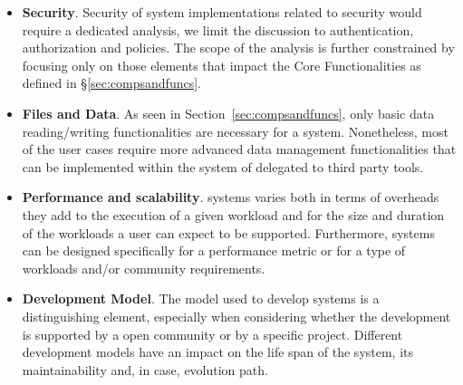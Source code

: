 \documentclass{sig-alternate}
\begin{document}
\begin{itemize}

\item \textbf{Security}. Security of \pilot system implementations related to
  security would require a dedicated analysis, we limit the discussion to
  authentication, authorization and policies. The scope of the analysis is
  further constrained by focusing only on those elements that impact the Core
  Functionalities as defined in \S\ref{sec:compsandfuncs}.


\item \textbf{Files and Data}. As seen in Section~\ref{sec:compsandfuncs}, only
  basic data reading/writing functionalities are necessary for a \pilot system.
  Nonetheless, most of the user cases require more advanced data management
  functionalities that can be implemented within the \pilot system of delegated
  to third party tools.

\item \textbf{Performance and scalability}. \pilot systems varies both in
  terms of overheads they add to the execution of a given workload and for the
  size and duration of the workloads a user can expect to be supported.
  Furthermore, \pilot systems can be designed specifically for a performance
  metric or for a type of workloads and/or community requirements.

\item \textbf{Development Model}. The model used to develop \pilot systems is a
  distinguishing element, especially when considering whether the development
  is supported by a open community or by a specific project. Different
  development models have an impact on the life span of the \pilot system, its
  maintainability and, in case, evolution path.

\end{itemize}
\end{document}
